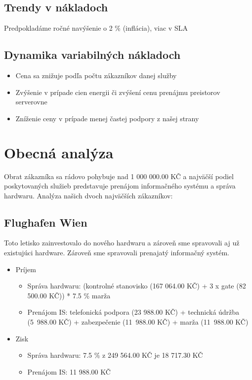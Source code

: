 \documentclass[a4paper, 11pt]{article}
\begin{document}
\subsection*{Trendy v nákladoch}
Predpokladáme ročné navýšenie o 2 \% (inflácia), viac v SLA

\subsection*{Dynamika variabilných nákladoch}
\begin{itemize}
\item Cena sa znižuje podľa počtu zákazníkov danej služby
\item Zvýšenie v prípade cien energii či zvýšení cenu prenájmu preistorov serverovne
\item Zníženie ceny v prípade menej častej podpory z našej strany
\end{itemize}

\clearpage
\section*{Obecná analýza}
Obrat zákazníka sa rádovo pohybuje nad 1 000 000.00 KČ a najväčší podiel poskytovaných služieb predstavuje prenájom informačného systému a správa hardwaru. Analýza našich dvoch najväčších zákazníkov:

\subsection*{Flughafen Wien}
Toto letisko zainvestovalo do nového hardwaru a zároveň sme spravovali aj už existujúci hardware. Zároveň sme spravovali prenajatý informačný systém.
\begin{itemize}
\item Príjem
\begin{itemize}
\item Správa hardwaru: (kontrolné stanovisko (167 064.00 KČ) + 3 x gate (82 500.00 KČ)) * 7.5 \% marža
\item Prenájom IS: telefonická podpora (23 988.00 KČ) + technická údržba (5~988.00 KČ) + zabezpečenie (11~988.00 KČ) + marža (11~988.00 KČ)
\end{itemize}

\item Zisk
\begin{itemize}
\item Správa hardwaru: 7.5 \% z 249 564.00 KČ je 18 717.30 KČ
\item Prenájom IS: 11 988.00 KČ
\end{itemize}
\end{itemize}
\end{document}
